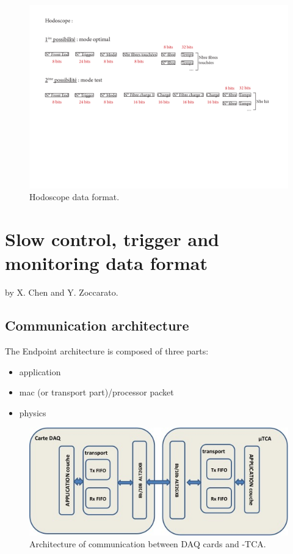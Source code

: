 	\begin{figure} [!hbtp]
	\centering
	\caption{Hodoscope data format.}
	\includegraphics[width=1\textwidth]{03_GraphicFiles/appendixA_dataFormat/2015_01_26_Format_datas_acquisition_hodoscope_update.pdf}
	\end{figure}



\clearpage
\newpage
\section{Slow control, trigger and monitoring data format}

by X. Chen and Y. Zoccarato.

\subsection{Communication architecture}

The Endpoint architecture is composed of three parts:
\begin{itemize}
	\item application
	\item mac (or transport part)/processor packet
	\item physics
\end{itemize}

	\begin{figure} [!hbtp]
	\centering
	\caption{Architecture of communication between DAQ cards and \charmu-TCA.}
	\includegraphics[width=1\textwidth]{03_GraphicFiles/appendixA_dataFormat/architecture_EndPont_update.jpg}
	\end{figure}

